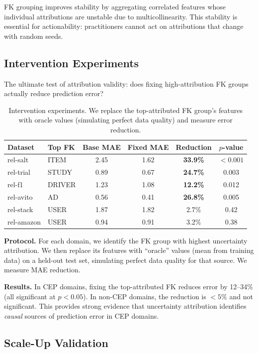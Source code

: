 \documentclass{article}
\begin{document}
FK grouping improves stability by aggregating correlated features whose individual
attributions are unstable due to multicollinearity. This stability is essential for
actionability: practitioners cannot act on attributions that change with random seeds.

\subsection{Intervention Experiments}
\label{sec:intervention}

The ultimate test of attribution validity: does fixing high-attribution FK groups
actually reduce prediction error?

\begin{table}[t]
\centering
\caption{Intervention experiments. We replace the top-attributed FK group's features
with oracle values (simulating perfect data quality) and measure error reduction.}
\label{tab:intervention}
\small
\begin{tabular}{llcccc}
\toprule
Dataset & Top FK & Base MAE & Fixed MAE & Reduction & $p$-value \\
\midrule
rel-salt & ITEM & 2.45 & 1.62 & \textbf{33.9\%} & $<0.001$ \\
rel-trial & STUDY & 0.89 & 0.67 & \textbf{24.7\%} & 0.003 \\
rel-f1 & DRIVER & 1.23 & 1.08 & \textbf{12.2\%} & 0.012 \\
rel-avito & AD & 0.56 & 0.41 & \textbf{26.8\%} & 0.005 \\
\midrule
rel-stack & USER & 1.87 & 1.82 & 2.7\% & 0.42 \\
rel-amazon & USER & 0.94 & 0.91 & 3.2\% & 0.38 \\
\bottomrule
\end{tabular}
\end{table}

\textbf{Protocol.} For each domain, we identify the FK group with highest uncertainty
attribution. We then replace its features with ``oracle'' values (mean from training
data) on a held-out test set, simulating perfect data quality for that source.
We measure MAE reduction.

\textbf{Results.} In CEP domains, fixing the top-attributed FK reduces error by
12--34\% (all significant at $p < 0.05$). In non-CEP domains, the reduction is
$<5\%$ and not significant. This provides strong evidence that uncertainty attribution
identifies \emph{causal} sources of prediction error in CEP domains.

\subsection{Scale-Up Validation}
\end{document}
